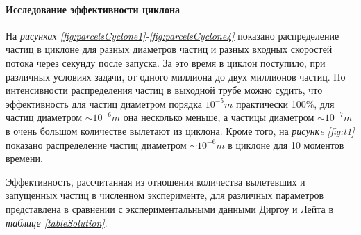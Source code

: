 \paragraph{Исследование эффективности циклона\\}

На \textit{рисунках \ref{fig:parcelsCyclone1}-\ref{fig:parcelsCyclone4}} показано распределение частиц в циклоне для разных диаметров частиц и разных входных скоростей потока через секунду после запуска. За это время в циклон поступило, при различных условиях задачи, от одного миллиона до двух миллионов частиц. По интенсивности распределения частиц в выходной трубе можно судить, что эффективность для частиц диаметром порядка $10^{-5}m$ практически 100\%, для частиц диаметром $\sim 10^{-6}m$ она несколько меньше, а частицы диаметром $\sim 10^{-7}m$ в очень большом количестве вылетают из циклона. Кроме того, на \textit{рисункe \ref{fig:t1}} показано распределение частиц диаметром $\sim 10^{-6}m$ в циклоне для 10 моментов времени.

Эффективность, рассчитанная из отношения количества вылетевших и запущенных частиц в численном эксперименте, для различных параметров представлена в сравнении с экспериментальными данными Диргоу и Лейта \cite{DirgoLeith} в \textit{таблице \ref{tableSolution}}.

